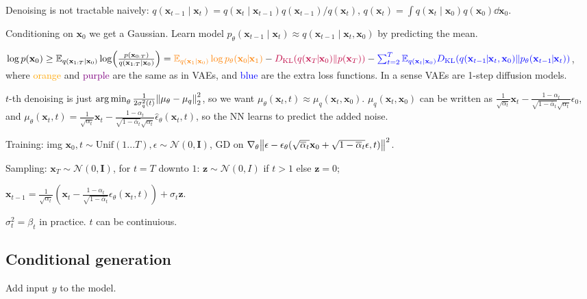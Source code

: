 \documentclass[11pt,landscape,a4paper,fleqn]{article}
\newcommand{\kl}[2]{D_{\mathrm{KL}}(#1\lVert#2)}
\newcommand{\E}{\mathbb{E}}
\DeclareMathOperator*{\argmin}{arg\,min}
\def\myvector#1{\mathbf{#1}}
\def\vx{{\myvector{x}}}
\def\vz{{\myvector{z}}}
\def\mymatrix#1{\mathbf{#1}}
\def\mI{{\mymatrix{I}}}
\begin{document}
\begin{multicols*}{4}
Denoising is not tractable naively:
$q(\vx_{t-1} \mid \vx_t) = q(\vx_t \mid \vx_{t-1}) q(\vx_{t-1}) / q(\vx_t)$,
$q(\vx_t) = \int q(\vx_t \mid \vx_0) q(\vx_0) \dd \vx_0$.

Conditioning on $\vx_0$ we get a Gaussian.
Learn model $p_\theta(\vx_{t-1} \mid \vx_t) \approx q(\vx_{t-1} \mid \vx_t, \vx_0)$
by predicting the mean.

$\log p(\vx_0) \geq \E_{q(\vx_{1:T} \mid \vx_0)} \log(\frac{p(\vx_{0:T})}{q(\vx_{1:T} \mid \vx_0)}) =
\textcolor{orange}{\E_{q(\vx_1 \mid \vx_0)}\log p_\theta(\vx_0 \!\!\mid\!\! \vx_1)} -
\textcolor{purple}{\kl{q(\vx_T \!\!\mid\!\! \vx_0)}{p(\vx_T)}} -
\textcolor{blue}{\sum_{t = 2}^T \E_{q(\vx_t \mid \vx_0)} \kl{q(\vx_{t-1} \!\!\mid\!\! \vx_t, \vx_0)}{p_\theta(\vx_{t-1} \!\!\mid\!\! \vx_t)}}$,
where \textcolor{orange}{orange} and \textcolor{purple}{purple} are the same as in VAEs,
and \textcolor{blue}{blue} are the extra loss functions.
In a sense VAEs are 1-step diffusion models.

$t$-th denoising is just $\argmin_\theta \frac{1}{2 \sigma_q^2(t)} \norm{\mu_\theta - \mu_q}_2^2$,
so we want $\mu_\theta(\vx_t, t) \approx \mu_q(\vx_t, \vx_0)$.
$\mu_q(\vx_t, \vx_0)$ can be written as
$\frac{1}{\sqrt{\alpha_t}} \vx_t - \frac{1 - \alpha_t}{\sqrt{1 - \overline{\alpha}_t} \sqrt{\alpha_t}} \epsilon_0$,
and $\mu_\theta(\vx_t, t) = \frac{1}{\sqrt{\alpha_t}} \vx_t - \frac{1 - \alpha_t}{\sqrt{1 - \overline{\alpha}_t} \sqrt{\alpha_t}} \hat{\epsilon}_\theta(\vx_t, t)$,
so the NN learns to predict the added noise.

Training: img $\vx_0, t \sim \mathrm{Unif}(1... T), \epsilon \sim \mathcal{N}(0, \mI)$,
GD on $\nabla_\theta\norm{\epsilon - \epsilon_\theta(\sqrt{\overline{\alpha}_t}\vx_0 + \sqrt{1 - \overline{\alpha}_t}\epsilon, t)}^2$.

Sampling: $\vx_T \sim \mathcal{N}(0, \mI)$, for $t = T$ downto $1$:
$\vz \sim \mathcal{N}(0, I)$ if $t > 1$ else $\vz = 0$;

$\vx_{t-1} = \frac{1}{\sqrt{\alpha_t}}(\vx_t - \frac{1 - \alpha_t}{\sqrt{1 - \overline{\alpha}_t}} \epsilon_\theta(\vx_t, t)) + \sigma_t \vz$.

$\sigma_t^2 = \beta_t$ in practice.
$t$ can be continuious.

\subsection{Conditional generation}

Add input $y$ to the model.


\end{multicols*}
\end{document}
